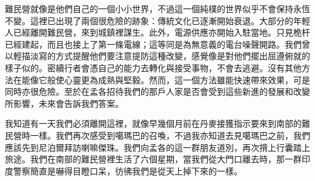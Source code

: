 難民營就像是他們自己的一個小小世界，不過這一個純樸的世界似乎不會保持永恆不變。這裡已出現了兩個很危險的跡象：傳統文化已逐漸開始衰退。大部分的年輕人已經離開難民營，來到城鎮裡謀生。此外，電源供應亦開始入駐當地。只見桅杆已經建起，而且也接上了第一條電線；這等同是為無意義的電台噪聲開路。我們曾以輕描淡寫的方式提醒他們要注意提防這種改變，感覺像是對他們擺出屈遵俯就的樣子似的。密續行者會憑自己的能力去轉化與接受事物，不會去逃避。沒有其他方法在能像它般使心靈更為成熟與堅毅。然而，這一個方法雖能快速帶來效果，可是同時亦很危險。至於在孟各招待我們的那戶人家是否會受到這些新進的發展和改變所影響，未來會告訴我們答案。

我知道有一天我們必須離開這裡，就像早幾個月前在丹麥接獲指示要來到南部的難民營時一樣。我們再次感受到噶瑪巴的召喚，不過我亦知道去見噶瑪巴之前，我們應該先到尼泊爾拜訪喇嘛傑珠。我們向孟各的這一群朋友道別，再次揹上行囊踏上旅途。我們在南部的難民營裡生活了六個星期，當我們從大門口離去時，那一群印度警察簡直是嚇得目瞪口呆，彷彿我們是從天上掉下來的一樣。

